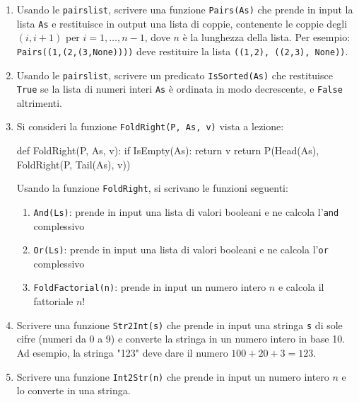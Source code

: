 \documentclass[11pt,a4]{article}
\begin{document}
\begin{enumerate}
\item Usando le {\tt pairslist}, scrivere una funzione {\tt Pairs(As)} che prende in input la lista
{\tt As} e restituisce in output una lista di coppie, contenente le coppie degli $(i, i+1)$ per $i =1,\dots,n-1$, dove
$n$ è la lunghezza della lista. Per esempio: {\tt Pairs((1,(2,(3,None))))} deve restituire la lista
{\tt ((1,2), ((2,3), None))}.


\item Usando le {\tt pairslist}, scrivere un predicato {\tt IsSorted(As)} che 
restituisce {\tt True} se la lista di numeri interi {\tt As} è ordinata in modo decrescente, e {\tt False}
altrimenti.

\item Si consideri la funzione {\tt FoldRight(P, As, v)} vista a lezione:

\begin{python}
def FoldRight(P, As, v):
    if IsEmpty(As):
        return v
    return P(Head(As), FoldRight(P, Tail(As), v))
\end{python}

Usando la funzione {\tt FoldRight}, si scrivano le funzioni seguenti:

\begin{enumerate}
\item {\tt And(Ls)}: prende in input una lista di valori booleani e ne calcola l'{\tt and} complessivo
\item {\tt Or(Ls)}: prende in input una lista di valori booleani e ne calcola l'{\tt or} complessivo
\item {\tt FoldFactorial(n)}: prende in input un numero intero $n$ e calcola il fattoriale $n!$
\end{enumerate}


\item Scrivere una funzione {\tt Str2Int(s)} che prende in input una stringa {\tt s} di sole cifre (numeri da 0 a 9) e converte la stringa in un numero intero in base 10. Ad esempio, la stringa "123" deve dare il numero $100+20+3 = 123$.


\item Scrivere una funzione {\tt Int2Str(n)} che prende in input un numero intero $n$ e lo converte in una stringa.



\end{enumerate}
\end{document}
